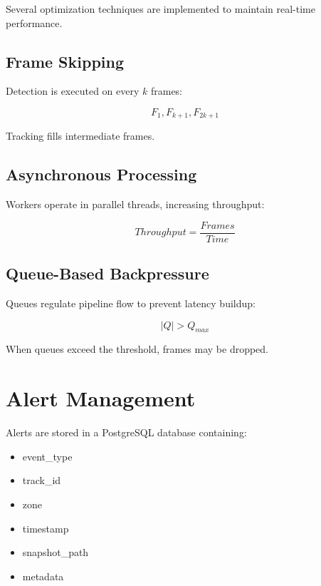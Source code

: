 \documentclass[conference]{IEEEtran}
\begin{document}
Several optimization techniques are implemented to maintain real-time performance.

\subsection{Frame Skipping}

Detection is executed on every $k$ frames:

\begin{equation}
F_1, F_{k+1}, F_{2k+1}
\end{equation}

Tracking fills intermediate frames.

\subsection{Asynchronous Processing}

Workers operate in parallel threads, increasing throughput:

\begin{equation}
Throughput = \frac{Frames}{Time}
\end{equation}

\subsection{Queue-Based Backpressure}

Queues regulate pipeline flow to prevent latency buildup:

\begin{equation}
|Q| > Q_{max}
\end{equation}

When queues exceed the threshold, frames may be dropped.

\section{Alert Management}

Alerts are stored in a PostgreSQL database containing:

\begin{itemize}
\item event\_type
\item track\_id
\item zone
\item timestamp
\item snapshot\_path
\item metadata
\end{itemize}
\end{document}

